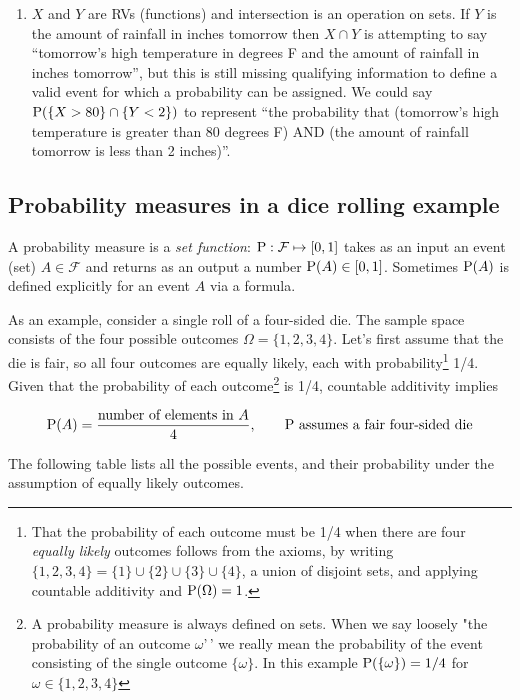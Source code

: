 \documentclass[
]{book}
\theoremstyle{definition}
\theoremstyle{definition}
\theoremstyle{definition}
\theoremstyle{remark}
\begin{document}
\begin{enumerate}
\item
  \(X\) and \(Y\) are RVs (functions) and intersection is an operation on sets. If \(Y\) is the amount of rainfall in inches tomorrow then \(X \cap Y\) is attempting to say ``tomorrow's high temperature in degrees F and the amount of rainfall in inches tomorrow'', but this is still missing qualifying information to define a valid event for which a probability can be assigned. We could say \(\textrm{P}(\{X > 80\} \cap \{Y < 2\})\) to represent ``the probability that (tomorrow's high temperature is greater than 80 degrees F) AND (the amount of rainfall tomorrow is less than 2 inches)''.
\end{enumerate}

\hypertarget{probability-measures-in-a-dice-rolling-example}{%
\subsection{Probability measures in a dice rolling example}\label{probability-measures-in-a-dice-rolling-example}}

A probability measure is a \emph{set function}: \(\textrm{P}:\mathcal{F}\mapsto[0, 1]\) takes as an input an event (set) \(A\in\mathcal{F}\) and returns as an output a number \(\textrm{P}(A)\in[0,1]\). Sometimes \(\textrm{P}(A)\) is defined explicitly for an event \(A\) via a formula.

As an example, consider a single roll of a four-sided die. The sample space consists of the four possible outcomes \(\Omega = \{1, 2, 3, 4\}\). Let's first assume that the die is fair, so all four outcomes are equally likely, each with probability\footnote{That the probability of each outcome must be 1/4 when there are four \emph{equally likely} outcomes follows from the axioms, by writing \(\{1, 2, 3, 4\} = \{1\}\cup\{2\}\cup \{3\}\cup \{4\}\), a union of disjoint sets, and applying countable additivity and \(\textrm{P}(\Omega)=1\).} 1/4. Given that the probability of each outcome\footnote{A probability measure is always defined on sets. When we say loosely "the probability of an outcome \(\omega\)'\,' we really mean the probability of the event consisting of the single outcome \(\{\omega\}\). In this example \(\textrm{P}(\{\omega\})=1/4\) for \(\omega\in\{1, 2, 3, 4\}\)} is 1/4, countable additivity implies

\[
\textrm{P}(A) = \frac{\text{number of elements in $A$}}{4}, \qquad{\text{$\textrm{P}$ assumes a fair four-sided die}}
\]

The following table lists all the possible events, and their probability under the assumption of equally likely outcomes.
\end{document}
